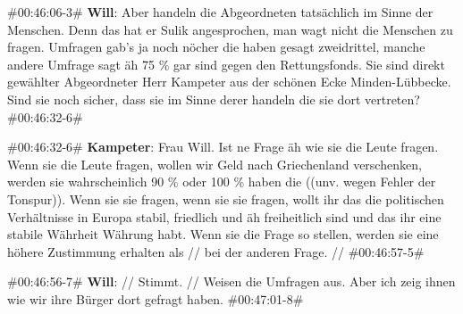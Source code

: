 \begin{description}
	\begin{linenumbers}[1]
		\item \#00:46:06-3\# \textbf{Will}: Aber handeln die Abgeordneten tatsächlich im Sinne der Menschen. Denn das hat er Sulik angesprochen, man wagt nicht die Menschen zu fragen. Umfragen gab's ja noch nöcher die haben gesagt zweidrittel, manche andere Umfrage sagt äh 75 \% gar sind gegen den Rettungsfonds. Sie sind direkt gewählter Abgeordneter Herr Kampeter aus der schönen Ecke Minden-Lübbecke. Sind sie noch sicher, dass sie im Sinne derer handeln die sie dort vertreten? \#00:46:32-6\#
		
		\item \#00:46:32-6\# \textbf{Kampeter}: Frau Will. Ist ne Frage äh wie sie die Leute fragen. Wenn sie die Leute fragen, wollen wir Geld nach Griechenland verschenken, werden sie wahrscheinlich 90 \% oder 100 \% haben die ((unv. wegen Fehler der Tonspur)). Wenn sie sie fragen, wenn sie sie fragen, wollt ihr das die politischen Verhältnisse in Europa stabil, friedlich und äh freiheitlich sind und das ihr eine stabile Währheit Währung habt. Wenn sie die Frage so stellen, werden sie eine höhere Zustimmung erhalten als // bei der anderen Frage. // \#00:46:57-5\# 
		
		\item \#00:46:56-7\# \textbf{Will}: // Stimmt. // Weisen die Umfragen aus. Aber ich zeig ihnen wie wir ihre Bürger dort gefragt haben. \#00:47:01-8\#
		

\end{linenumbers}
\end{description}
